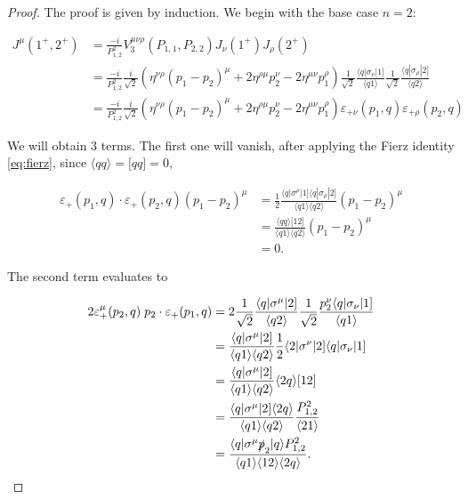 \documentclass{article}
\theoremstyle{definition}
\numberwithin{equation}{section}
\begin{document}
\begin{proof}

    The proof is given by induction. We begin with the base case $n=2$:

    \begin{align*}
        J^{\mu}(1^{+}, 2^{+}) &= \frac{-i}{P_{1,2}^2} V_3^{\mu \nu \rho}(P_{1,1}, P_{2,2}) J_{\nu}(1^{+}) J_{\rho}(2^{+}) \\
        &= \frac{-i}{P_{1,2}^2} \frac{i}{\sqrt{2}} \left( \eta^{\nu \rho} \left( p_1 - p_2 \right)^{\mu} + 2 \eta^{\rho \mu} p_2^{\nu} - 2 \eta^{\mu \nu} p_1^{\rho}  \right) \frac{1}{\sqrt{2}} \frac{ \langle q | \sigma_{\nu} | 1 \rbrack }{ \langle q 1 \rangle } \frac{1}{\sqrt{2}} \frac{ \langle q | \sigma_{\rho} | 2 \rbrack }{ \langle q 2 \rangle } \\
        &= \frac{-i}{P_{1,2}^2} \frac{i}{\sqrt{2}} \left( \eta^{\nu \rho} \left( p_1 - p_2 \right)^{\mu} + 2 \eta^{\rho \mu} p_2^{\nu} - 2 \eta^{\mu \nu} p_1^{\rho}  \right) \varepsilon_{+\nu}(p_1,q) \varepsilon_{+\rho}(p_2,q)
    \end{align*}

    We will obtain 3 terms. The first one will vanish, after applying the Fierz identity \eqref{eq:fierz}, since $\langle qq \rangle = \lbrack qq \rbrack = 0$,

    \begin{align*}
        \varepsilon_{+}(p_1,q) \cdot \varepsilon_{+}(p_2,q) \left( p_1 - p_2 \right)^{\mu}
        &= \frac{1}{2} \frac{\langle q | \sigma^{\rho} | 1 \rbrack \langle q | \sigma_{\rho} | 2 \rbrack }{\langle q 1 \rangle \langle q 2 \rangle} \left( p_1 - p_2 \right)^{\mu} \\
        &= \frac{\langle qq \rangle \lbrack 12 \rbrack}{\langle q 1 \rangle \langle q 2 \rangle} \left( p_1 - p_2 \right)^{\mu} \\
        &= 0.
    \end{align*}

    The second term evaluates to

    \begin{align*}
        2 \varepsilon_{+}^{\mu}(p_2,q) \; p_2 \cdot \varepsilon_{+}(p_1,q) &= 2 \frac{1}{\sqrt{2}} \frac{ \langle q | \sigma^{\mu} | 2 \rbrack }{ \langle q2 \rangle } \frac{1}{\sqrt{2}} \frac{ p_2^{\nu} \langle q | \sigma_{\nu} | 1 \rbrack }{ \langle q1 \rangle } \\
        &= \frac{\langle q | \sigma^{\mu} | 2 \rbrack}{\langle q1 \rangle \langle q2 \rangle} \frac{1}{2} \langle 2 | \sigma^{\nu} | 2 \rbrack \langle q | \sigma_{\nu} | 1 \rbrack \\
        &= \frac{\langle q | \sigma^{\mu} | 2 \rbrack}{\langle q1 \rangle \langle q2 \rangle} \langle 2q \rangle \lbrack 12 \rbrack \\
        &= \frac{\langle q | \sigma^{\mu} | 2 \rbrack \langle 2q \rangle}{\langle q1 \rangle \langle q2 \rangle} \frac{ P_{1,2}^2 }{ \langle 21 \rangle } \\
        &= \frac{\langle q | \sigma^{\mu} \slashed{p}_2 | q \rangle P_{1,2}^2}{\langle q1 \rangle \langle 12 \rangle \langle 2q \rangle}.
    \end{align*}


\end{proof}
\end{document}
